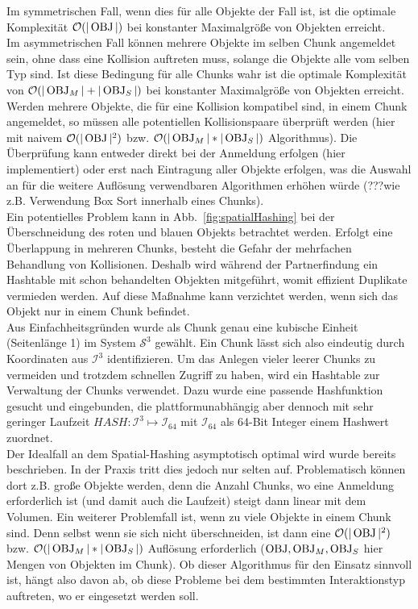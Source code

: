 Im symmetrischen Fall, wenn dies für alle Objekte der Fall ist, ist die optimale Komplexität $\mathcal{O}(|\operatorname{OBJ}|)$  bei konstanter Maximalgröße von Objekten erreicht.\\
Im asymmetrischen Fall können mehrere Objekte im selben Chunk angemeldet sein, ohne dass eine Kollision auftreten muss, solange die Objekte alle vom selben Typ sind. Ist diese Bedingung für alle Chunks wahr ist die optimale Komplexität von $\mathcal{O}(|\operatorname{OBJ}_M|+|\operatorname{OBJ}_S|)$ bei konstanter Maximalgröße von Objekten erreicht. \\
Werden mehrere Objekte, die für eine Kollision kompatibel sind, in einem Chunk angemeldet, so müssen alle potentiellen Kollisionspaare überprüft werden (hier mit naivem $\mathcal{O}(|\operatorname{OBJ}|^2)$ bzw. $\mathcal{O}(|\operatorname{OBJ}_M|*|\operatorname{OBJ}_S|)$ Algorithmus). Die Überprüfung kann entweder direkt bei der Anmeldung erfolgen (hier implementiert) oder erst nach Eintragung aller Objekte erfolgen, was die Auswahl an für die weitere Auflösung verwendbaren Algorithmen erhöhen würde (???wie z.B. Verwendung Box Sort innerhalb eines Chunks).\\
Ein potentielles Problem kann in Abb.~\ref{fig:spatialHashing} bei der Überschneidung des roten und blauen Objekts betrachtet werden. Erfolgt eine Überlappung in mehreren Chunks, besteht die Gefahr der mehrfachen Behandlung von Kollisionen. Deshalb wird während der Partnerfindung ein Hashtable mit schon behandelten Objekten mitgeführt, womit effizient Duplikate vermieden werden. Auf diese Maßnahme kann verzichtet werden, wenn sich das Objekt nur in einem Chunk befindet.\\
Aus Einfachheitsgründen wurde als Chunk genau eine kubische Einheit (Seitenlänge 1) im System $\mathcal{S}^3$ gewählt. Ein Chunk lässt sich also eindeutig durch Koordinaten aus $\mathcal{I}^3$ identifizieren. Um das Anlegen vieler leerer Chunks zu vermeiden und trotzdem schnellen Zugriff zu haben, wird ein Hashtable zur Verwaltung der Chunks verwendet. Dazu wurde eine passende Hashfunktion gesucht und eingebunden, die plattformunabhängig aber dennoch mit sehr geringer Laufzeit $HASH: \mathcal{I}^3 \mapsto \mathcal{I}_{64}$ mit $\mathcal{I}_{64}$ als 64-Bit Integer einem Hashwert zuordnet.\\
Der Idealfall an dem Spatial-Hashing asymptotisch optimal wird wurde bereits beschrieben. In der Praxis tritt dies jedoch nur selten auf. Problematisch können dort z.B. große Objekte werden, denn die Anzahl Chunks, wo eine Anmeldung erforderlich ist (und damit auch die Laufzeit) steigt dann linear mit dem Volumen. Ein weiterer Problemfall ist, wenn zu viele Objekte in einem Chunk sind. Denn selbst wenn sie sich nicht überschneiden, ist dann eine $\mathcal{O}(|\operatorname{OBJ}|^2)$ bzw. $\mathcal{O}(|\operatorname{OBJ}_M|*|\operatorname{OBJ}_S|)$ Auflösung erforderlich ($\operatorname{OBJ}, \operatorname{OBJ}_M, \operatorname{OBJ}_S$ hier Mengen von Objekten im Chunk). Ob dieser Algorithmus für den Einsatz sinnvoll ist, hängt also davon ab, ob diese Probleme bei dem bestimmten Interaktionstyp auftreten, wo er eingesetzt werden soll.\\


